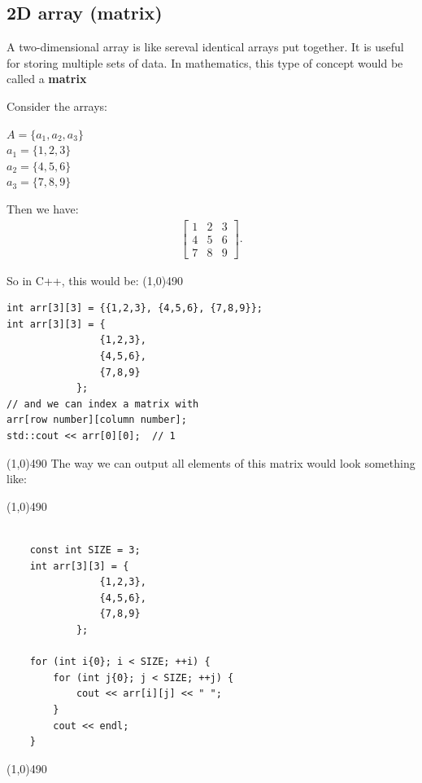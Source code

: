 \documentclass{report}
\begin{document}
    \pagebreak \bigbreak \noindent 
    \subsection{2D array (matrix)}
    \bigbreak \noindent 
    \begin{concept}
 A two-dimensional array is like sereval identical arrays put together. It is useful for storing multiple sets of data. In mathematics, this type of concept would be called a \textbf{matrix}
	\end{concept}
    \bigbreak \noindent 
    \begin{minipage}[]{0.47\textwidth}
    Consider the arrays:
    \begin{center}
        $A = \{a_{1}, a_{2}, a_{3}\} $ \\
        $a_{1} = \{1,2,3\} $ \\
        $a_{2} = \{4,5,6\} $ \\
        $a_{3} = \{7,8,9\} $ \\
    \end{center}
    \end{minipage}
    \begin{minipage}[]{0.47\textwidth}
    Then we have:
    \begin{align*}
        \begin{bmatrix}
            1 & 2 & 3 \\
            4 & 5 & 6 \\
            7 & 8 & 9
        \end{bmatrix}
    .\end{align*}
    \end{minipage}
    \bigbreak \noindent 
    So in C++, this would be:
    \bigbreak \noindent 
    \line(1,0){490}
    \begin{verbatim}
int arr[3][3] = {{1,2,3}, {4,5,6}, {7,8,9}};
int arr[3][3] = {
                {1,2,3},
                {4,5,6},
                {7,8,9}
            };
// and we can index a matrix with
arr[row number][column number];
std::cout << arr[0][0];  // 1
    \end{verbatim}
    \line(1,0){490}
    \bigbreak \noindent 
    The way we can output all elements of this matrix would look something like:
    \bigbreak \noindent 
    \begin{minipage}[t]{0.47\textwidth}
    \bigbreak \noindent 
    \line(1,0){490}
    \begin{verbatim}

    const int SIZE = 3;
    int arr[3][3] = {
                {1,2,3},
                {4,5,6},
                {7,8,9}
            };

    for (int i{0}; i < SIZE; ++i) {
        for (int j{0}; j < SIZE; ++j) {
            cout << arr[i][j] << " ";
        } 
        cout << endl;
    }
    \end{verbatim}
    \line(1,0){490}
    \end{minipage}
\end{document}
